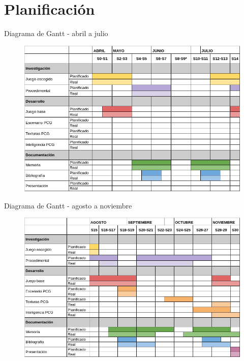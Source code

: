 \documentclass{beamer}
\begin{document}
\section{Planificación}

    \begin{frame}{Diagrama de Gantt - abril a julio \scriptsize{\hfill \secname}}
        \begin{figure}[H]
        \centering
            \includegraphics[scale=0.375]{img/gantt-A.PNG}
        \end{figure}
    \end{frame}
    
    \begin{frame}{Diagrama de Gantt - agosto a noviembre \scriptsize{\hfill \secname}}
        \begin{figure}[H]
        \centering
            \includegraphics[scale=0.375]{img/gantt-B.PNG}
        \end{figure}
    \end{frame}
\end{document}
